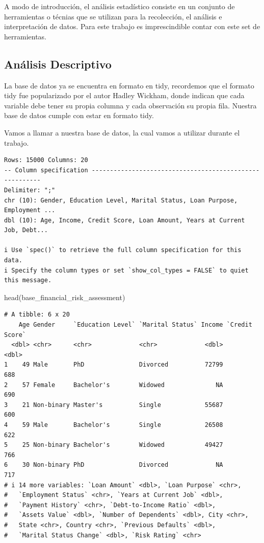 \documentclass[
  letterpaper,
  DIV=11,
  numbers=noendperiod]{scrreprt}
\newenvironment{Shaded}{\begin{snugshade}}{\end{snugshade}}
\newcommand{\FunctionTok}[1]{\textcolor[rgb]{0.28,0.35,0.67}{#1}}
\newcommand{\NormalTok}[1]{\textcolor[rgb]{0.00,0.23,0.31}{#1}}
\begin{document}
A modo de introducción, el análisis estadístico consiste en un conjunto
de herramientas o técnias que se utilizan para la recolección, el
análisis e interpretación de datos. Para este trabajo es imprescindible
contar con este set de herramientas.

\subsection{Análisis Descriptivo}\label{anuxe1lisis-descriptivo}

La base de datos ya se encuentra en formato en tidy, recordemos que el
formato tidy fue popularizado por el autor Hadley Wickham, donde indican
que cada variable debe tener su propia columna y cada observación su
propia fila. Nuestra base de datos cumple con estar en formato tidy.

Vamos a llamar a nuestra base de datos, la cual vamos a utilizar durante
el trabajo.

\begin{verbatim}
Rows: 15000 Columns: 20
-- Column specification --------------------------------------------------------
Delimiter: ";"
chr (10): Gender, Education Level, Marital Status, Loan Purpose, Employment ...
dbl (10): Age, Income, Credit Score, Loan Amount, Years at Current Job, Debt...

i Use `spec()` to retrieve the full column specification for this data.
i Specify the column types or set `show_col_types = FALSE` to quiet this message.
\end{verbatim}

\begin{Shaded}
\begin{Highlighting}[]
\FunctionTok{head}\NormalTok{(base\_financial\_risk\_assessment)}
\end{Highlighting}
\end{Shaded}

\begin{verbatim}
# A tibble: 6 x 20
    Age Gender     `Education Level` `Marital Status` Income `Credit Score`
  <dbl> <chr>      <chr>             <chr>             <dbl>          <dbl>
1    49 Male       PhD               Divorced          72799            688
2    57 Female     Bachelor's        Widowed              NA            690
3    21 Non-binary Master's          Single            55687            600
4    59 Male       Bachelor's        Single            26508            622
5    25 Non-binary Bachelor's        Widowed           49427            766
6    30 Non-binary PhD               Divorced             NA            717
# i 14 more variables: `Loan Amount` <dbl>, `Loan Purpose` <chr>,
#   `Employment Status` <chr>, `Years at Current Job` <dbl>,
#   `Payment History` <chr>, `Debt-to-Income Ratio` <dbl>,
#   `Assets Value` <dbl>, `Number of Dependents` <dbl>, City <chr>,
#   State <chr>, Country <chr>, `Previous Defaults` <dbl>,
#   `Marital Status Change` <dbl>, `Risk Rating` <chr>
\end{verbatim}
\end{document}

